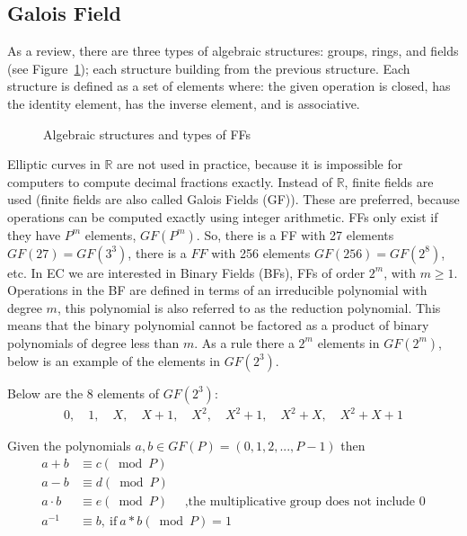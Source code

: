 \subsection{Galois Field} 
As a review, there are three types of algebraic structures: groups, rings, and fields (see Figure~\ref{fig:DH:DHKE_3}); each structure building from the previous structure.  Each structure is defined as a set of elements where: the given operation is closed, has the identity element, has the inverse element, and is associative.
\begin{figure}[H]
	  \caption{\label{fig:DH:DHKE_3} Algebraic structures and types of FFs }
\end{figure}
Elliptic curves in $\mathbb{R}$ are not used in practice, because it is impossible for computers to compute decimal fractions exactly.  Instead of $\mathbb{R}$, finite fields are used (finite fields are also called Galois Fields (GF)).  These are preferred, because operations can be computed exactly using integer arithmetic. FFs only exist if they have $P^m$ elements, $GF(P^m)$. So, there is a FF with 27 elements $GF(27) = GF(3^3)$, there is a $FF$ with 256 elements $GF(256) = GF(2^8)$, etc.  In EC we are interested in Binary Fields (BFs), FFs of order $2^m$, with $m ≥ 1$.  Operations in the BF are defined in terms of an irreducible polynomial with degree $m$, this polynomial is also referred to as the reduction polynomial.  This means that the binary polynomial cannot be factored as a product of binary polynomials of degree less than $m$.  As a rule there a $2^m$ elements in $GF(2^m)$, below is an example of the elements in $GF(2^3)$.  
\newline \newline
\begin{eg} Below are the 8 elements of $GF(2^3)$:
\begin{align*}
0, \quad 1, \quad X, \quad X +1, \quad X^2, \quad X^2+1, \quad X^2 + X, \quad X^2 + X + 1
 \end{align*}
\end{eg}
\begin{rem} Given the polynomials $a,b \in  GF(P) = (0,1,2,...,P-1)$ then 
\begin{align*} 		
		a + b &\equiv c (\bmod P)\\
		a - b &\equiv d (\bmod P)\\
		a \cdot b &\equiv e (\bmod P) \quad \text{ ,the multiplicative group does not include 0}\\
		a^{-1} &\equiv b, \mathrm{~if~} a * b (\bmod P) = 1
\end{align*}
\end{rem}	
